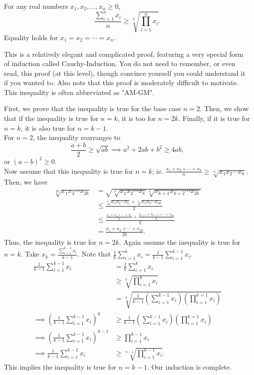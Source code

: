 \documentclass[blue,onecol]{shooting}
\begin{document}
\begin{theo} 
For any real numbers $x_1,x_2,\ldots,x_n\ge0$, \[\frac{\sum_{i=1}^nx_i}n\ge\sqrt[n]{\prod_{i=1}^nx_i}. \] Equality holds for $x_1=x_2=\cdots=x_n$. 
\end{theo}
This is a relatively elegant and complicated proof, featuring a very special form of induction called Cauchy-Induction. You do not need to remember, or even read, this proof (at this level), though convince yourself you could understand it if you wanted to. Also note that this proof is moderately difficult to motivate. This inequality is often abbreviated as "AM-GM".  
\begin{pro}
First, we prove that the inequality is true for the base case $n=2$. Then, we show that if the inequality is true for $n=k$, it is too for $n=2k$. Finally, if it is true for $n=k$, it is also true for $n=k-1$.
\\[1\baselineskip]
For $n=2$, the inequality rearranges to \[\frac{a+b}2\ge\sqrt{ab}\implies a^2+2ab+b^2\ge 4ab,\] or $(a-b)^2\ge0$.
\\[1\baselineskip]
Now assume that this inequality is true for $n=k$; ie. $\frac{x_1+x_2+\cdots+x_k}n\ge\sqrt[n]{x_1x_2\cdots x_k}$. Then, we have
\begin{align*}
\sqrt[2k]{x_1x_2\cdots x_{2k}}&=\sqrt{\sqrt[n]{x_1x_2\cdots x_{k}}\sqrt[k]{x_{k+1}x_{k+2}\cdots x_{2k}}}\\&\le \frac{\sqrt[k]{x_1x_2\cdots x_k}+ \sqrt[k]{x_1x_2\cdots x_{2k}}}2\\&\le \frac{\frac{x_1+x_2+\cdots+x_k}k+\frac{x_{k+1}+x_{k+2}+\cdots+x_{2k}}k}2\\&=\frac{x_1+x_2+\cdots+x_{2k}}{2k}.
\end{align*}
Thus, the inequality is true for $n=2k$. 
Again assume the inequality is true for $n=k$. Take $x_k=\frac{\sum\limits_{i=1}^{k-1}x_i}{k-1}$. Note that $\frac1k\sum\limits_{i=1}^kx_i=\frac1{k-1}\sum\limits_{i=1}^{k-1}x_i$. 
\begin{align*}
    \frac1{k-1}\sum_{i=1}^{k-1}x_i&=\frac1k\sum_{i=1}^kx_i\\&\ge \sqrt[k]{\prod_{i=1}^kx_i}\\&=\sqrt[k]{\frac{1}{k-1}\left(\sum_{i=1}^{k-1}x_i\right)\left(\prod_{i=1}^{k=1}x_i\right)}\\\implies \left(\frac1{k-1}\sum_{i=1}^{k-1}x_i\right)^{k}&\ge\frac{1}{k-1}\left(\sum_{i=1}^{k-1}x_i\right)\left(\prod_{i=1}^{k=1}x_i\right)\\\implies \left(\frac1{k-1}\sum_{i=1}^{k-1}x_i\right)^{k-1}&\ge \prod_{i=1}^{k-1}x_i\\\implies \frac1{k-1}\sum_{i=1}^{k-1}x_i&\ge \sqrt[n-1]{\prod_{i=1}^{k-1}x_i}.
\end{align*}
This implies the inequality is true for $n=k-1$. Our induction is complete. 
\end{pro}
\end{document}

